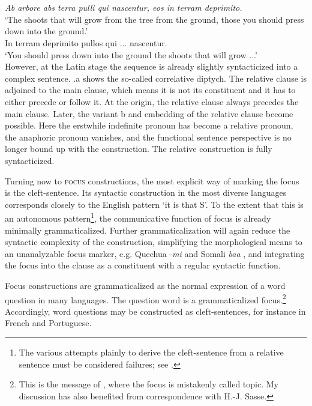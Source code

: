 \ea\label{ex:E96}
 \\
 \ea  {}\\ 
 {\itshape Ab arbore abs terra pulli qui nascentur, eos in terram deprimito.}\\
 \glt ‘The shoots that will grow from the tree from the ground, those you should press down into the ground.’\\
\ex
   In terram deprimito pullos qui ... nascentur.\\
\glt  ‘You should press down into the ground the shoots that will grow ...’\\
\z
\z
\noindent \label{page125b}However, at the Latin stage the sequence is already slightly syntacticized into a complex sentence. .a shows the so-called correlative diptych. The relative clause is adjoined to the main clause, which means it is not its constituent and it has to either precede or follow it. At the origin, the relative clause always precedes the main clause. Later, the variant b and embedding of the relative clause become possible. Here the erstwhile indefinite pronoun has become a relative pronoun, the anaphoric pronoun vanishes, and the functional sentence perspective is no longer bound up with the construction. The relative construction is fully syntacticized.

Turning now to \textsc{focus} constructions, the most explicit way of marking the focus is the cleft-sentence. Its syntactic construction in the most diverse languages corresponds closely to the English pattern ‘it is \np that S’. To the extent that this is an autonomous pattern\footnote{The various attempts plainly to derive the cleft-sentence from a relative sentence must be considered failures; see \citealt[Ch.~V.5.3]{Lehmann1984}.}, the communicative function of focus is already minimally grammaticalized. Further grammaticalization will again reduce the syntactic complexity of the construction, simplifying the morphological means to an unanalyzable focus marker, e.g. Quechua -\textit{mi} \citep[35f]{Cole1982} and Somali \textit{baa} \citep[348f]{Sasse1977b}, and integrating the focus \np into the clause as a constituent with a regular syntactic function.

Focus constructions are grammaticalized as the normal expression of a word question in many languages. The question word is a grammaticalized focus.\footnote{\label{page125}This is the message of \citet{Sasse1977b}, where the focus is mistakenly called topic. My discussion has also benefited from correspondence with H.-J. Sasse.} Accordingly, word questions may be constructed as cleft-sentences, for instance in French and Portuguese.

